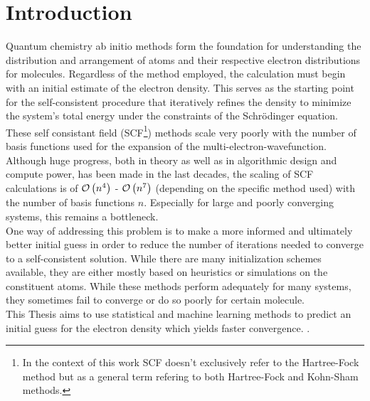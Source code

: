 \chapter{Introduction}
\label{sec:introduction}

Quantum chemistry ab initio methods form the foundation for understanding the distribution and arrangement of atoms and their respective electron distributions for molecules. Regardless of the method employed, the calculation must begin with an initial estimate of the electron density. This serves as the starting point for the self-consistent procedure that iteratively refines the density to minimize the system's total energy under the constraints of the Schrödinger equation. These self consistant field (SCF\footnote{In the context of this work SCF doesn't exclusively refer to the Hartree-Fock method but as a general term refering to both Hartree-Fock and Kohn-Sham methods.}) methods scale very poorly with the number of basis functions used for the expansion of the multi-electron-wavefunction. Although huge progress, both in theory as well as in algorithmic design and compute power, has been made in the last decades, the scaling of SCF calculations is of $\mathcal{O}\left(n^4\right)$ - $\mathcal{O}\left(n^7\right)$ (depending on the specific method used) with the number of basis functions $n$. Especially for large and poorly converging systems, this remains a bottleneck. \\

One way of addressing this problem is to make a more informed and ultimately better initial guess in order to reduce the number of iterations needed to converge to a self-consistent solution. While there are many initialization schemes available, they are either mostly based on heuristics or simulations on the constituent atoms. While these methods perform adequately for many systems, they sometimes fail to converge or do so poorly for certain molecule. \\
This Thesis aims to use statistical and machine learning methods to predict an initial guess for the electron density which yields faster convergence. . 



